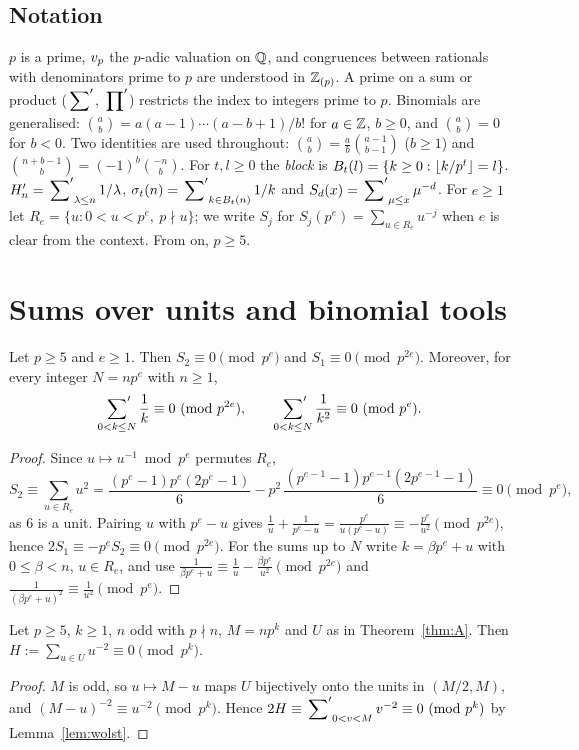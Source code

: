 \documentclass[11pt]{amsart}
\begin{document}
\subsection*{Notation} $p$ is a prime, $v_p$ the $p$-adic valuation on $\mathbb{Q}$, and congruences between rationals with denominators prime to $p$ are understood in $\mathbb{Z}_{(p)}$. A prime on a sum or product ($\sideset{}{'}\sum$, $\sideset{}{'}\prod$) restricts the index to integers prime to $p$. Binomials are generalised: $\binom ab=a(a-1)\cdots(a-b+1)/b!$ for $a\in\mathbb{Z}$, $b\ge0$, and $\binom ab=0$ for $b<0$. Two identities are used throughout: $\binom ab=\frac ab\binom{a-1}{b-1}$ ($b\ge1$) and $\binom{n+b-1}b=(-1)^b\binom{-n}b$. For $t,l\ge0$ the \emph{block} is $B_t(l)=\{k\ge0:\left\lfloor k/p^t\right\rfloor=l\}$. $H'_n=\sideset{}{'}\sum_{\lambda\le n}1/\lambda$, $\sigma_t(n)=\sideset{}{'}\sum_{k\in B_t(n)}1/k$ and $S_d(x)=\sideset{}{'}\sum_{\mu\le x}\mu^{-d}$. For $e\ge1$ let $R_e=\{u:0<u<p^e,\ p\nmid u\}$; we write $S_j$ for $S_j(p^e)=\sum_{u\in R_e}u^{-j}$ when $e$ is clear from the context. From  on, $p\ge5$.

\section{Sums over units and binomial tools}\label{sec:tools}
\begin{lemma}\label{lem:wolst}
Let $p\ge5$ and $e\ge1$. Then $S_2\equiv0\pmod{p^e}$ and $S_1\equiv0\pmod{p^{2e}}$. Moreover, for every integer $N=np^e$ with $n\ge1$,
\[ \sideset{}{'}\sum_{0<k\le N}\frac1k\equiv0\ (\mathrm{mod}\ p^{2e}),\qquad \sideset{}{'}\sum_{0<k\le N}\frac1{k^2}\equiv0\ (\mathrm{mod}\ p^{e}). \]
\end{lemma}
\begin{proof}
Since $u\mapsto u^{-1}\bmod p^e$ permutes $R_e$,
\[ S_2\equiv\sum_{u\in R_e}u^2=\frac{(p^e-1)p^e(2p^e-1)}6-p^2\,\frac{(p^{e-1}-1)p^{e-1}(2p^{e-1}-1)}6\equiv0\pmod{p^e}, \]
as $6$ is a unit. Pairing $u$ with $p^e-u$ gives $\frac1u+\frac1{p^e-u}=\frac{p^e}{u(p^e-u)}\equiv-\frac{p^e}{u^2}\pmod{p^{2e}}$, hence $2S_1\equiv-p^eS_2\equiv0\pmod{p^{2e}}$. For the sums up to $N$ write $k=\beta p^e+u$ with $0\le\beta<n$, $u\in R_e$, and use $\frac1{\beta p^e+u}\equiv\frac1u-\frac{\beta p^e}{u^2}\pmod{p^{2e}}$ and $\frac1{(\beta p^e+u)^2}\equiv\frac1{u^2}\pmod{p^e}$.
\end{proof}

\begin{lemma}\label{lem:half}
Let $p\ge5$, $k\ge1$, $n$ odd with $p\nmid n$, $M=np^k$ and $U$ as in Theorem~\ref{thm:A}. Then $H:=\sum_{u\in U}u^{-2}\equiv0\pmod{p^k}$.
\end{lemma}
\begin{proof}
$M$ is odd, so $u\mapsto M-u$ maps $U$ bijectively onto the units in $(M/2,M)$, and $(M-u)^{-2}\equiv u^{-2}\pmod{p^k}$. Hence $2H\equiv\sideset{}{'}\sum_{0<v<M}v^{-2}\equiv0\ (\mathrm{mod}\ p^k)$ by Lemma~\ref{lem:wolst}.
\end{proof}
\end{document}
